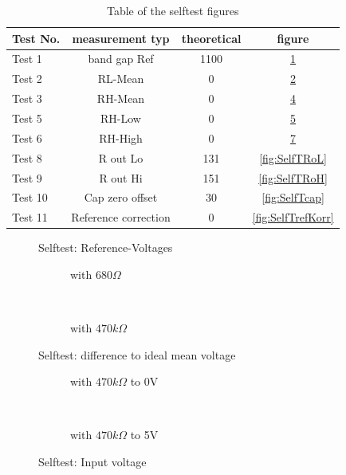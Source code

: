 \begin{table}[H]
  \begin{center}
    \begin{tabular}{| l | c | c | c |}
    \hline
Test No. & measurement typ & theoretical & figure \\
    \hline
    \hline
Test 1 & band gap Ref  & 1100 & \ref{fig:SelfTref} \\
    \hline
Test 2 & RL-Mean & 0 & \ref{fig:SelfTMitL} \\
    \hline
Test 3 & RH-Mean & 0 & \ref{fig:SelfTMitH} \\
    \hline
Test 5 & RH-Low &  0 & \ref{fig:SelfTlowH} \\
    \hline
Test 6 & RH-High & 0 & \ref{fig:SelfTtopH} \\
    \hline
Test 8 & R out Lo & 131 & \ref{fig:SelfTRoL} \\
    \hline
Test 9 & R out Hi & 151 & \ref{fig:SelfTRoH} \\
    \hline
Test 10 & Cap zero offset & 30 & \ref{fig:SelfTcap} \\
    \hline
Test 11 & Reference correction & 0 & \ref{fig:SelfTrefKorr} \\
    \hline
    \end{tabular}
  \end{center}
  \caption{Table of the selftest figures }
  \label{tab:test_m168} 
\end{table}

\begin{figure}[H]
\centering

\caption{Selftest: Reference-Voltages}
\label{fig:SelfTref}
\end{figure}


\begin{figure}[H]
  \begin{subfigure}[b]{9cm}
    \centering
    \resizebox{9cm}{!}{}
    \caption{with \(680 \Omega\)}
    \label{fig:SelfTMitL}
  \end{subfigure}
  ~
  \begin{subfigure}[b]{9cm}
    \centering
    \resizebox{9cm}{!}{}
    \caption{with \(470 k\Omega\)}
    \label{fig:SelfTMitH}
  \end{subfigure}
  \caption{Selftest: difference to ideal mean voltage}
\end{figure}

\begin{figure}[H]
  \begin{subfigure}[b]{9cm}
  \centering
    \resizebox{9cm}{!}{}
    \caption{with \(470 k\Omega\) to 0V}
    \label{fig:SelfTlowH}
  \end{subfigure}
  ~
  \begin{subfigure}[b]{9cm}
  \centering
    \resizebox{9cm}{!}{}
    \caption{with \(470 k\Omega\) to 5V}
    \label{fig:SelfTtopH}
  \end{subfigure}
  \caption{Selftest: Input voltage}
\end{figure}

